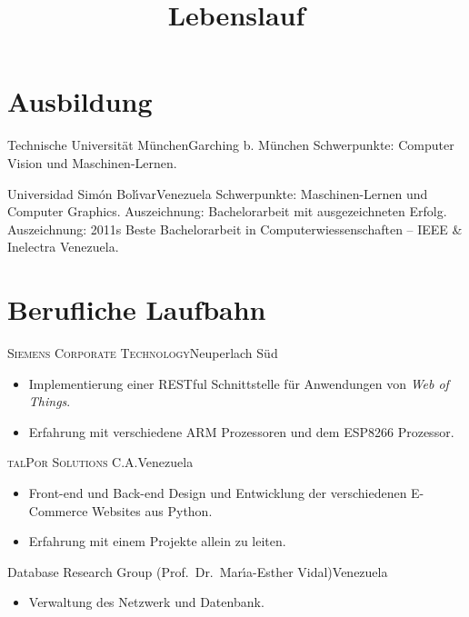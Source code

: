 \documentclass[10pt]{moderncv}
\title{Lebenslauf}
\begin{document}
\maketitle

\section{Ausbildung}

{Technische Universit\"at M\"unchen}{Garching b. M\"{u}nchen}{}{%
    Schwerpunkte: Computer Vision und Maschinen-Lernen.
  }

  {Universidad Sim\'on Bol\'{\i}var}{Venezuela}{}{%
    Schwerpunkte: Maschinen-Lernen und Computer Graphics.
    \newline
    Auszeichnung: Bachelorarbeit mit ausgezeichneten Erfolg.
    \newline
    Auszeichnung: 2011s Beste Bachelorarbeit in Computerwiessenschaften -- IEEE \& Inelectra Venezuela.
  }

\section{Berufliche Laufbahn}

{\textsc{Siemens Corporate Technology}}{Neuperlach S\"{u}d}{}{%
\begin{itemize}
  \item Implementierung einer RESTful Schnittstelle f\"{u}r Anwendungen von 
    \textit{Web of Things}.
  \item Erfahrung mit verschiedene ARM Prozessoren und dem ESP8266 Prozessor.
\end{itemize}
}

{\textsc{talPor Solutions C.A.}}{Venezuela}{}{%
\begin{itemize}
  \item Front-end und Back-end Design und Entwicklung der verschiedenen E-Commerce 
    Websites aus Python.
  \item Erfahrung mit einem Projekte allein zu leiten.
\end{itemize}
}

{Database Research Group (Prof.\ Dr.\ Mar\'{\i}a-Esther Vidal)}{Venezuela}{}{%
\begin{itemize}
  \item Verwaltung des Netzwerk und Datenbank.
\end{itemize}
}
\end{document}
